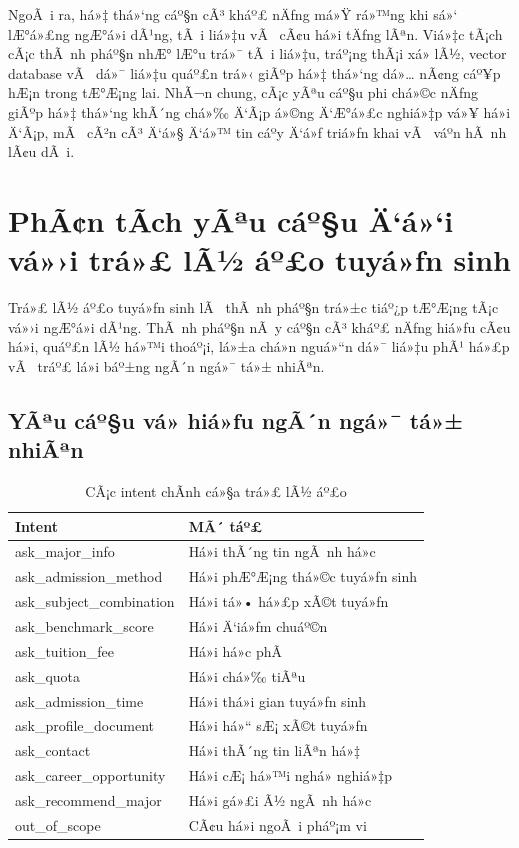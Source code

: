 ﻿\documentclass[12pt,a4paper]{report}
\begin{document}
NgoÃ i ra, há»‡ thá»‘ng cáº§n cÃ³ kháº£ nÄƒng má»Ÿ rá»™ng khi sá»‘ lÆ°á»£ng ngÆ°á»i dÃ¹ng, tÃ i liá»‡u vÃ  cÃ¢u há»i tÄƒng lÃªn. Viá»‡c tÃ¡ch cÃ¡c thÃ nh pháº§n nhÆ° lÆ°u trá»¯ tÃ i liá»‡u, tráº¡ng thÃ¡i xá»­ lÃ½, vector database vÃ  dá»¯ liá»‡u quáº£n trá»‹ giÃºp há»‡ thá»‘ng dá»… nÃ¢ng cáº¥p hÆ¡n trong tÆ°Æ¡ng lai. NhÃ¬n chung, cÃ¡c yÃªu cáº§u phi chá»©c nÄƒng giÃºp há»‡ thá»‘ng khÃ´ng chá»‰ Ä‘Ã¡p á»©ng Ä‘Æ°á»£c nghiá»‡p vá»¥ há»i Ä‘Ã¡p, mÃ  cÃ²n cÃ³ Ä‘á»§ Ä‘á»™ tin cáº­y Ä‘á»ƒ triá»ƒn khai vÃ  váº­n hÃ nh lÃ¢u dÃ i.


% 
\section{PhÃ¢n tÃ­ch yÃªu cáº§u Ä‘á»‘i vá»›i trá»£ lÃ½ áº£o tuyá»ƒn sinh}

Trá»£ lÃ½ áº£o tuyá»ƒn sinh lÃ  thÃ nh pháº§n trá»±c tiáº¿p tÆ°Æ¡ng tÃ¡c vá»›i ngÆ°á»i dÃ¹ng. ThÃ nh pháº§n nÃ y cáº§n cÃ³ kháº£ nÄƒng hiá»ƒu cÃ¢u há»i, quáº£n lÃ½ há»™i thoáº¡i, lá»±a chá»n nguá»“n dá»¯ liá»‡u phÃ¹ há»£p vÃ  tráº£ lá»i báº±ng ngÃ´n ngá»¯ tá»± nhiÃªn.

\subsection{YÃªu cáº§u vá» hiá»ƒu ngÃ´n ngá»¯ tá»± nhiÃªn}
\begin{table}[H]
\centering
\caption{CÃ¡c intent chÃ­nh cá»§a trá»£ lÃ½ áº£o}
\label{tab:intents_main}
\begin{tabular}{|p{4.2cm}|p{7.8cm}|}
\hline
\textbf{Intent} & \textbf{MÃ´ táº£} \\ \hline
ask\_major\_info & Há»i thÃ´ng tin ngÃ nh há»c \\ \hline
ask\_admission\_method & Há»i phÆ°Æ¡ng thá»©c tuyá»ƒn sinh \\ \hline
ask\_subject\_combination & Há»i tá»• há»£p xÃ©t tuyá»ƒn \\ \hline
ask\_benchmark\_score & Há»i Ä‘iá»ƒm chuáº©n \\ \hline
ask\_tuition\_fee & Há»i há»c phÃ­ \\ \hline
ask\_quota & Há»i chá»‰ tiÃªu \\ \hline
ask\_admission\_time & Há»i thá»i gian tuyá»ƒn sinh \\ \hline
ask\_profile\_document & Há»i há»“ sÆ¡ xÃ©t tuyá»ƒn \\ \hline
ask\_contact & Há»i thÃ´ng tin liÃªn há»‡ \\ \hline
ask\_career\_opportunity & Há»i cÆ¡ há»™i nghá» nghiá»‡p \\ \hline
ask\_recommend\_major & Há»i gá»£i Ã½ ngÃ nh há»c \\ \hline
out\_of\_scope & CÃ¢u há»i ngoÃ i pháº¡m vi \\ \hline
\end{tabular}
\end{table}
\end{document}
